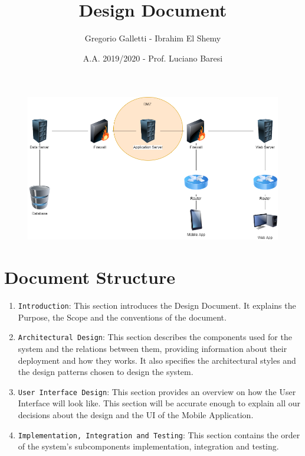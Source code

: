 \documentclass[11pt]{article} %
\title{Design Document}
\author{Gregorio Galletti - Ibrahim El Shemy}
\date{A.A. 2019/2020 - Prof. Luciano Baresi} %
\begin{document}
\begin{figure}[H]
\centering
\includegraphics[width=\textwidth,height=\textheight,keepaspectratio]{architecture.png}
\end{figure}
\maketitle

\tableofcontents
\newpage

\section{Document Structure}
\begin{enumerate}

\item \texttt{Introduction}: This section introduces the Design Document. It explains the Purpose, the Scope and the conventions of the document.
\item \texttt{Architectural Design}: This section describes the components used for the system and the relations between them, providing information about their deployment and how they works. It also specifies the architectural styles and the design patterns chosen to design the system.
\item \texttt{User Interface Design}: This section provides an overview on how the User Interface will look like. This section will be accurate enough to explain all our decisions about the design and the UI of the Mobile Application. 
\item \texttt{Implementation, Integration and Testing}: This section contains the order of the system's subcomponents implementation, integration and testing.

\end{enumerate}
\end{document}
